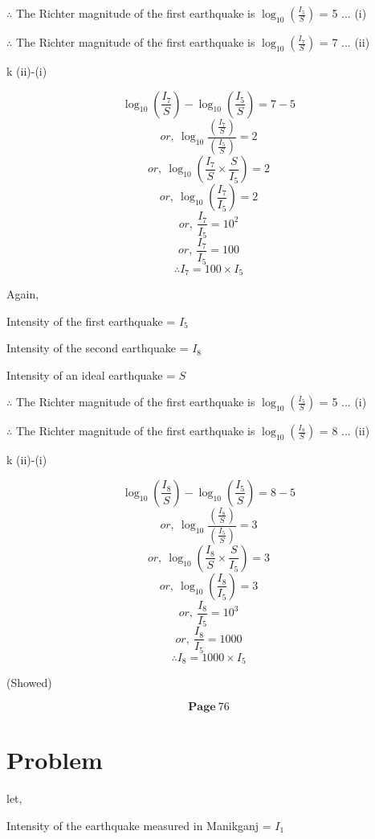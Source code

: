 \documentclass{report}
\begin{document}
\hspace{30cm}

$\therefore$ The Richter magnitude of the first earthquake is $\log_{10}\left(\frac{I_5}{S}\right)$ = 5 ... (i)

$\therefore$ The Richter magnitude of the first earthquake is $\log_{10}\left(\frac{I_7}{S}\right)$ = 7 ... (ii)

\hspace{30cm}
k (ii)-(i)

$$\log_{10}\left(\frac{I_7}{S}\right) - \log_{10}\left(\frac{I_5}{S}\right) = 7-5$$
$$or,\: \log_{10} \frac{\left(\frac{I_7}{S}\right)}{\left(\frac{I_5}{S}\right)} = 2$$
$$or,\: \log_{10}\left(\frac{I_7}{S}\times\frac{S}{I_5}\right) = 2 $$
$$or,\: \log_{10}\left(\frac{I_7}{I_5}\right) = 2$$
$$or,\: \frac{I_7}{I_5} = 10^{2}$$
$$or,\: \frac{I_7}{I_5} = 100$$
$$\therefore I_7 = 100 \times I_5$$


Again,


Intensity of the first earthquake  = $I_5$

Intensity of the second earthquake = $I_8$ 

Intensity of an ideal earthquake = $S$

\hspace{30cm}

$\therefore$ The Richter magnitude of the first earthquake is $\log_{10}\left(\frac{I_5}{S}\right)$ = 5 ... (i)

$\therefore$ The Richter magnitude of the first earthquake is $\log_{10}\left(\frac{I_8}{S}\right)$ = 8 ... (ii)

\hspace{30cm}
k (ii)-(i)

$$\log_{10}\left(\frac{I_8}{S}\right) - \log_{10}\left(\frac{I_5}{S}\right) = 8-5$$
$$or,\: \log_{10} \frac{\left(\frac{I_8}{S}\right)}{\left(\frac{I_5}{S}\right)} = 3$$
$$or,\: \log_{10}\left(\frac{I_8}{S}\times\frac{S}{I_5}\right) = 3 $$
$$or,\: \log_{10}\left(\frac{I_8}{I_5}\right) = 3$$
$$or,\: \frac{I_8}{I_5} = 10^{3}$$
$$or,\: \frac{I_8}{I_5} = 1000$$
$$\therefore I_8 = 1000 \times I_5$$



(Showed)


$$\textbf{Page} \: 76$$
\section{Problem}
let,

Intensity of the earthquake measured in Manikganj = $I_1$
\end{document}
